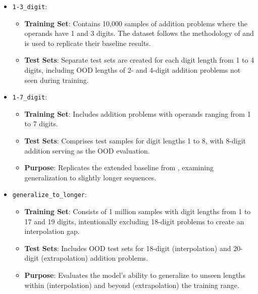 \begin{itemize}
  \item \texttt{1-3\_digit}:
        \begin{itemize}
          \item \textbf{Training Set}: Contains 10,000 samples of addition problems where the operands have 1 and 3 digits. The dataset follows the methodology of \cite{lee_teaching_2023} and is used to replicate their baseline results.
          \item \textbf{Test Sets}: Separate test sets are created for each digit length from 1 to 4 digits, including OOD lengths of 2- and 4-digit addition problems not seen during training.
        \end{itemize}

  \item \texttt{1-7\_digit}:
        \begin{itemize}
          \item \textbf{Training Set}: Includes addition problems with operands ranging from 1 to 7 digits.
          \item \textbf{Test Sets}: Comprises test samples for digit lengths 1 to 8, with 8-digit addition serving as the OOD evaluation.
          \item \textbf{Purpose}: Replicates the extended baseline from \cite{lee_teaching_2023}, examining generalization to slightly longer sequences.
        \end{itemize}

  \item \texttt{generalize\_to\_longer}:
        \begin{itemize}
          \item \textbf{Training Set}: Consists of 1 million samples with digit lengths from 1 to 17 and 19 digits, intentionally excluding 18-digit problems to create an interpolation gap.
          \item \textbf{Test Sets}: Includes OOD test sets for 18-digit (interpolation) and 20-digit (extrapolation) addition problems.
          \item \textbf{Purpose}: Evaluates the model's ability to generalize to unseen lengths within (interpolation) and beyond (extrapolation) the training range.
        \end{itemize}


\end{itemize}
